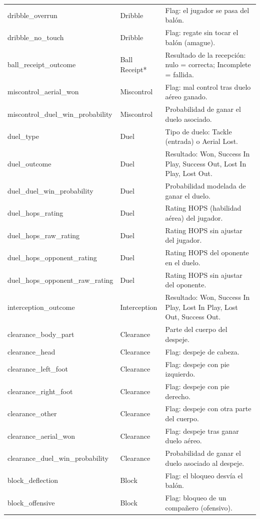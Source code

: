 {\begin{longtable}{p{4.3cm}p{2.2cm}p{8.8cm}}
dribble\_overrun & Dribble & Flag: el jugador se pasa del balón. \\
dribble\_no\_touch & Dribble & Flag: regate sin tocar el balón (amague). \\
ball\_receipt\_outcome & Ball Receipt* & Resultado de la recepción: nulo = correcta; Incomplete = fallida. \\
miscontrol\_aerial\_won & Miscontrol & Flag: mal control tras duelo aéreo ganado. \\
miscontrol\_duel\_win\_probability & Miscontrol & Probabilidad de ganar el duelo asociado. \\
duel\_type & Duel & Tipo de duelo: Tackle (entrada) o Aerial Lost. \\
duel\_outcome & Duel & Resultado: Won, Success In Play, Success Out, Lost In Play, Lost Out. \\
duel\_duel\_win\_probability & Duel & Probabilidad modelada de ganar el duelo. \\
duel\_hops\_rating & Duel & Rating HOPS (habilidad aérea) del jugador. \\
duel\_hops\_raw\_rating & Duel & Rating HOPS sin ajustar del jugador. \\
duel\_hops\_opponent\_rating & Duel & Rating HOPS del oponente en el duelo. \\
duel\_hops\_opponent\_raw\_rating & Duel & Rating HOPS sin ajustar del oponente. \\
interception\_outcome & Interception & Resultado: Won, Success In Play, Lost In Play, Lost Out, Success Out. \\
clearance\_body\_part & Clearance & Parte del cuerpo del despeje. \\
clearance\_head & Clearance & Flag: despeje de cabeza. \\
clearance\_left\_foot & Clearance & Flag: despeje con pie izquierdo. \\
clearance\_right\_foot & Clearance & Flag: despeje con pie derecho. \\
clearance\_other & Clearance & Flag: despeje con otra parte del cuerpo. \\
clearance\_aerial\_won & Clearance & Flag: despeje tras ganar duelo aéreo. \\
clearance\_duel\_win\_probability & Clearance & Probabilidad de ganar el duelo asociado al despeje. \\
block\_deflection & Block & Flag: el bloqueo desvía el balón. \\
block\_offensive & Block & Flag: bloqueo de un compañero (ofensivo). \\

\end{longtable}}
